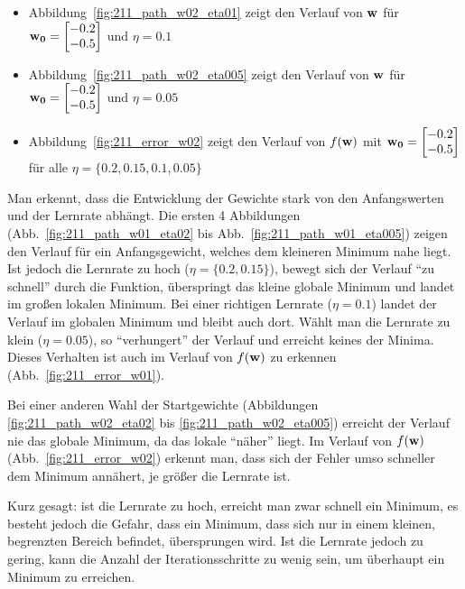 \begin{itemize}
  \item Abbildung~\ref{fig:211_path_w02_eta01} zeigt den Verlauf von $\mathbf{w}$ für $\mathbf{w_0} = \begin{bmatrix} -0.2 \\ -0.5 \end{bmatrix}$ und $\eta = 0.1$
  \item Abbildung~\ref{fig:211_path_w02_eta005} zeigt den Verlauf von $\mathbf{w}$ für $\mathbf{w_0} = \begin{bmatrix} -0.2 \\ -0.5 \end{bmatrix}$ und $\eta = 0.05$
  \item Abbildung~\ref{fig:211_error_w02} zeigt den Verlauf von $f(\mathbf{w})$ mit $\mathbf{w_0} = \begin{bmatrix} -0.2 \\ -0.5 \end{bmatrix}$ für alle $\eta = \{0.2, 0.15, 0.1, 0.05\}$
\end{itemize}

Man erkennt, dass die Entwicklung der Gewichte stark von den Anfangswerten und der Lernrate abhängt. Die ersten 4 Abbildungen (Abb.~\ref{fig:211_path_w01_eta02} bis Abb.~\ref{fig:211_path_w01_eta005}) zeigen den Verlauf für ein Anfangsgewicht, welches dem kleineren Minimum nahe liegt. Ist jedoch die Lernrate zu hoch ($\eta = \{0.2, 0.15\}$), bewegt sich der Verlauf ``zu schnell'' durch die Funktion, überspringt das kleine globale Minimum und landet im großen lokalen Minimum. Bei einer richtigen Lernrate ($\eta = 0.1$) landet der Verlauf im globalen Minimum und bleibt auch dort. Wählt man die Lernrate zu klein ($\eta = 0.05$), so ``verhungert'' der Verlauf und erreicht keines der Minima. Dieses Verhalten ist auch im Verlauf von $f(\mathbf{w})$ zu erkennen (Abb.~\ref{fig:211_error_w01}).

Bei einer anderen Wahl der Startgewichte (Abbildungen \ref{fig:211_path_w02_eta02} bis \ref{fig:211_path_w02_eta005}) erreicht der Verlauf nie das globale Minimum, da das lokale ``näher'' liegt. Im Verlauf von $f(\mathbf{w})$ (Abb.~\ref{fig:211_error_w02}) erkennt man, dass sich der Fehler umso schneller dem Minimum annähert, je größer die Lernrate ist.

Kurz gesagt: ist die Lernrate zu hoch, erreicht man zwar schnell ein Minimum, es besteht jedoch die Gefahr, dass ein Minimum, dass sich nur in einem kleinen, begrenzten Bereich befindet, übersprungen wird. Ist die Lernrate jedoch zu gering, kann die Anzahl der Iterationsschritte zu wenig sein, um überhaupt ein Minimum zu erreichen.


